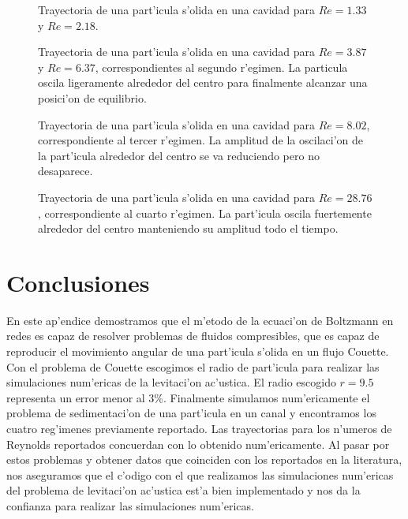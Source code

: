 \begin{figure}
\centering

\caption{\label{fig:regimen-1-sedimentacion}
Trayectoria de una part'icula s'olida en una cavidad para $Re=1.33$ y $Re=2.18$.
}
\end{figure}
%
\begin{figure}

\caption{\label{fig:regimen-2-sedimentacion}
Trayectoria de una part'icula s'olida en una cavidad para $Re=3.87$ y $Re=6.37$, correspondientes
al segundo  r'egimen. La particula oscila ligeramente alrededor del centro para finalmente alcanzar una 
posici'on de equilibrio.
}
\end{figure}
%
\begin{figure}

\caption{\label{fig:regimen-3-sedimentacion}
Trayectoria de una part'icula s'olida en una cavidad para $Re=8.02$, correspondiente
al tercer  r'egimen. La amplitud de la oscilaci'on de la part'icula alrededor del centro
se va reduciendo pero no desaparece.
}
\end{figure}
%
\begin{figure}

\caption{\label{fig:regimen-4-sedimentacion}
Trayectoria de una part'icula s'olida en una cavidad para $Re=28.76$, correspondiente
al cuarto  r'egimen. La part'icula oscila fuertemente alrededor del centro manteniendo
su amplitud todo el tiempo.
}
\end{figure}


\section{Conclusiones}

En este ap'endice demostramos que el m'etodo de la ecuaci'on de Boltzmann en redes
es capaz de resolver problemas de fluidos compresibles, que es capaz de reproducir
el movimiento angular de una part'icula s'olida en un flujo Couette. Con el problema
de Couette escogimos el radio de part'icula para realizar las simulaciones num'ericas
de la levitaci'on ac'ustica. El radio escogido $r=9.5$ representa un error
menor al 3\%. Finalmente  simulamos num'ericamente el problema de sedimentaci'on de 
una part'icula en un canal y encontramos  los cuatro reg'imenes previamente reportado. Las
trayectorias para los n'umeros de Reynolds reportados concuerdan con lo 
obtenido num'ericamente. 
Al pasar por estos problemas y obtener datos que coinciden con los reportados en la literatura, nos aseguramos
que el c'odigo con el que realizamos las simulaciones num'ericas del problema de levitaci'on
ac'ustica est'a bien implementado y nos da la confianza para realizar las simulaciones num'ericas.
